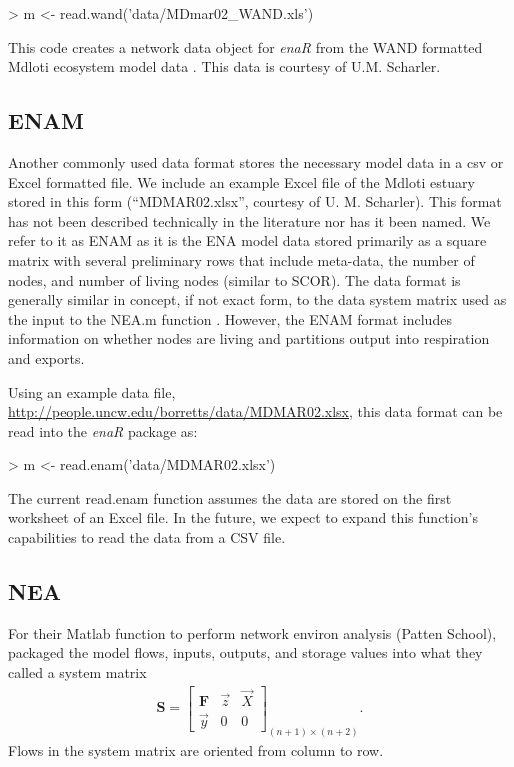 \documentclass[article]{jss}
\begin{document}
\begin{Schunk}
\begin{Sinput}
> m <- read.wand('data/MDmar02_WAND.xls')
\end{Sinput}
\end{Schunk}

This code creates a network data object for \textit{enaR} from the WAND
formatted Mdloti ecosystem model data
\citep{scharler2012ecosystem}. This data is courtesy of U.M. Scharler.

\subsection*{ENAM}

Another commonly used data format stores the necessary model data in a
csv or Excel formatted file.  We include an example Excel file of the
Mdloti estuary stored in this form (``MDMAR02.xlsx'', courtesy
of U. M. Scharler).  This format has not been described technically in
the literature nor has it been named.  We refer to it as ENAM as it is
the ENA model data stored primarily as a square matrix with several
preliminary rows that include meta-data, the number of nodes, and
number of living nodes (similar to SCOR).  The data format is
generally similar in concept, if not exact form, to the data system
matrix used as the input to the NEA.m function \citep{fath06}.
However, the ENAM format includes information on whether nodes are
living and partitions output into respiration and exports.

Using an example data file,
\url{http://people.uncw.edu/borretts/data/MDMAR02.xlsx}, this data
format can be read into the \textit{enaR} package as:

\begin{Schunk}
\begin{Sinput}
>   m <- read.enam('data/MDMAR02.xlsx')
\end{Sinput}
\end{Schunk}

The current read.enam function assumes the data are stored on the
first worksheet of an Excel file. In the future, we expect to expand
this function's capabilities to read the data from a CSV file.

\subsection*{NEA}

For their Matlab function to perform network environ analysis (Patten School),
\citet{fath06} packaged the model flows, inputs, outputs, and storage
values into what they called a system matrix
\begin{align}
\mathbf{S} = \left[ \begin{array}{ccc} \mathbf{F} & \vec{z} & \vec{X} \\
     \vec{y}  &  0 & 0 \end{array}
\right]_{(n+1) \times (n+2)}.
\end{align}
Flows in the system matrix are oriented from column to row.
\end{document}
